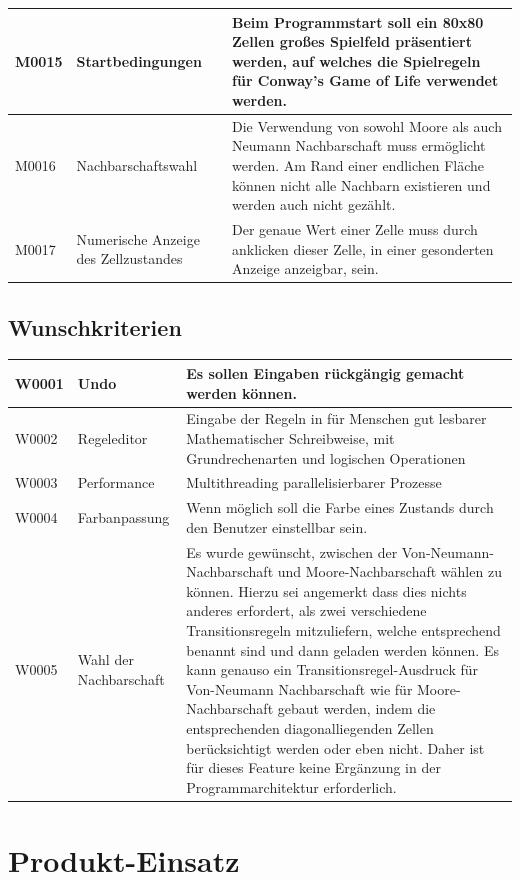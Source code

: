 \documentclass[11pt,a4paper]{article}
\begin{document}
\begin{longtable}[m]{|m{2.2cm}|m{4cm}|m{8cm}|}
\hline
M0015 & Startbedingungen & Beim Programmstart soll ein 80x80 Zellen großes Spielfeld präsentiert werden, auf welches die Spielregeln für Conway's Game of Life verwendet werden. \\

\hline
M0016 & Nachbarschaftswahl & Die Verwendung von sowohl Moore als auch Neumann Nachbarschaft muss ermöglicht werden. Am Rand einer endlichen Fläche können nicht alle Nachbarn existieren und werden auch nicht gezählt. \\

\hline
M0017 & Numerische Anzeige des Zellzustandes & Der genaue Wert einer Zelle muss durch anklicken dieser Zelle, in einer gesonderten Anzeige anzeigbar, sein. \\
\hline
\end{longtable}    
\newpage

\subsection{Wunschkriterien}
\begin{longtable}[m]{|m{2.2cm}|m{4cm}|m{8cm}|}
\hline
W0001 & Undo & Es sollen Eingaben rückgängig gemacht werden können.\\
\hline
W0002 & Regeleditor & Eingabe der Regeln in für Menschen gut lesbarer Mathematischer Schreibweise, mit Grundrechenarten und logischen Operationen\\
\hline
W0003 & Performance & Multithreading parallelisierbarer Prozesse\\
\hline
W0004 &Farbanpassung & Wenn möglich soll die Farbe eines Zustands durch den Benutzer einstellbar sein.\\
\hline
W0005 & Wahl der Nachbarschaft & Es wurde gewünscht, zwischen der Von-Neumann-Nachbarschaft und Moore-Nachbarschaft wählen zu können. Hierzu sei angemerkt dass dies nichts anderes erfordert, als zwei verschiedene Transitionsregeln mitzuliefern, welche entsprechend benannt sind und dann geladen werden können. Es kann genauso ein Transitionsregel-Ausdruck für Von-Neumann Nachbarschaft wie für Moore-Nachbarschaft gebaut werden, indem die entsprechenden diagonalliegenden Zellen berücksichtigt werden oder eben nicht. Daher ist für dieses Feature keine Ergänzung in der Programmarchitektur erforderlich.\\
\hline
\end{longtable}

\pagebreak
\section{Produkt-Einsatz}
\end{document}
